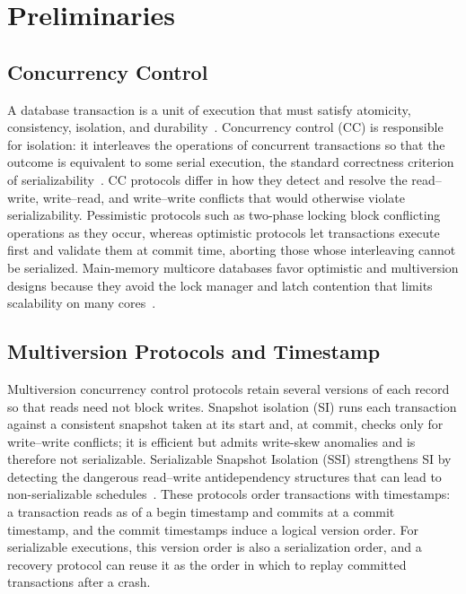 \section{Preliminaries}
\label{sec:background}

\subsection{Concurrency Control}

A database transaction is a unit of execution that must satisfy atomicity,
consistency, isolation, and durability~\cite{haerder1983principles}.
Concurrency control (CC) is responsible for isolation: it interleaves the
operations of concurrent transactions so that the outcome is equivalent to some
serial execution, the standard correctness criterion of
serializability~\cite{bernstein1987ccr}.  CC protocols differ in how they detect
and resolve the read--write, write--read, and write--write conflicts that would
otherwise violate serializability.  Pessimistic protocols such as two-phase
locking block conflicting operations as they occur, whereas optimistic protocols
let transactions execute first and validate them at commit time, aborting those
whose interleaving cannot be serialized.  Main-memory multicore databases favor
optimistic and multiversion designs because they avoid the lock manager and
latch contention that limits scalability on many
cores~\cite{tu2013silo,kim2016ermia,tanabe2020ccbench}.

\subsection{Multiversion Protocols and Timestamp}

Multiversion concurrency control protocols retain several versions of each record so that
reads need not block writes.  Snapshot isolation (SI) runs each transaction
against a consistent snapshot taken at its start and, at commit, checks only for
write--write conflicts; it is efficient but admits write-skew anomalies and is
therefore not serializable.  Serializable Snapshot Isolation (SSI) strengthens
SI by detecting the dangerous read--write antidependency structures that can
lead to non-serializable schedules~\cite{ports2012ssi}.  These protocols order
transactions with timestamps: a transaction reads as of a begin timestamp and
commits at a commit timestamp, and the commit timestamps induce a logical
version order.  For serializable executions, this version order is also a
serialization order, and a recovery protocol can reuse it as the order in which
to replay committed transactions after a crash.

